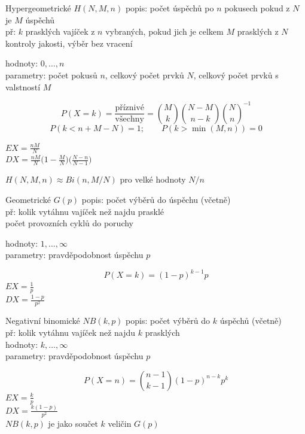 \documentclass[smaller]{beamer}
\def\xskip{{\vspace{2ex}}}
\begin{document}
\begin{frame}{Hypergeometrické $H(N,M,n)$}
popis: počet úspěchů po $n$ pokusech pokud z $N$ je $M$ úspěchů\\
př: $k$ prasklých vajíček z $n$ vybraných, pokud jich je celkem $M$ prasklých z $N$\\
kontroly jakosti, výběr bez vracení

\xskip
hodnoty: $0, \dots, n$ \\
parametry: počet pokusů $n$, celkový počet prvků $N$, celkový počet prvků s valstností $M$

\xskip
\[
 P(X=k) = \frac{\text{příznivé}}{\text{všechny}}=
  \binom{M}{k}\binom{N-M}{n-k}\binom{N}{n}^{-1}
\]
\[
 P(k< n+M-N) = 1; \qquad  P(k> \min(M,n)) = 0
\]


$EX = \frac{nM}{N}$\\
$DX = \frac{nM}{N}\big(1-\frac{M}{N}\big)\big(\frac{N-n}{N-1}\big)$

$H(N,M,n) \approx Bi(n,M/N)$ pro velké hodnoty $N/n$
\end{frame}

\begin{frame}{Geometrické $G(p)$}
popis: počet výběrů do úspěchu (včetně)\\
př: kolik vytáhnu vajíček než najdu prasklé\\
počet provozních cyklů do poruchy

\xskip
hodnoty: $1, \dots, \infty$ \\
parametry: pravděpodobnost úspěchu $p$

\xskip
\[
 P(X=k) = (1-p)^{k-1}p
\]
$EX = \frac{1}{p}$\\
$DX = \frac{1-p}{p^2}$\\
\end{frame}

\begin{frame}{Negativní binomické $NB(k,p)$}
popis: počet výběrů do $k$ úspěchů (včetně)\\
př: kolik vytáhnu vajíček než najdu $k$ prasklých\\

\xskip
hodnoty: $k, \dots, \infty$ \\
parametry: pravděpodobnost úspěchu $p$

\xskip
\[
 P(X=n) = \binom{n-1}{k-1}(1-p)^{n-k}p^k
\]
$EX = \frac{k}{p}$\\
$DX = \frac{k(1-p)}{p^2}$\\
$NB(k,p)$ je jako součet $k$ veličin $G(p)$
\end{frame}
\end{document}
